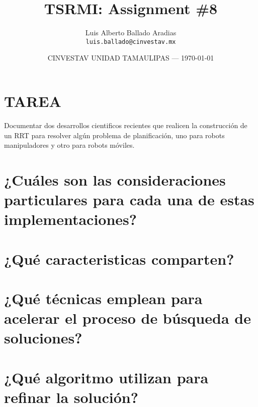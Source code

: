 \documentclass{article}
\title{TSRMI: Assignment \#8} %
\author{Luis Alberto Ballado Aradias\\ \texttt{luis.ballado@cinvestav.mx}} %
\date{CINVESTAV UNIDAD TAMAULIPAS --- \today} %
\begin{document}
\maketitle %


\section*{TAREA}
Documentar dos desarrollos cientificos recientes que realicen la construcción de un RRT para resolver algún problema de planificación, uno para robots manipuladores y otro para robots móviles.

\section{¿Cuáles son las consideraciones particulares para cada una de estas implementaciones?} 


\newpage
\section{¿Qué caracteristicas comparten?}



\newpage
\section{¿Qué técnicas emplean para acelerar el proceso de búsqueda de soluciones?}

\newpage
\section{¿Qué algoritmo utilizan para refinar la solución?}
\end{document}
